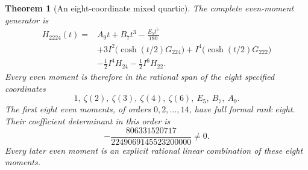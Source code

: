 \documentclass[11pt,letterpaper]{article}
\numberwithin{equation}{section}
\newtheorem{theorem}{Theorem}[section]
\theoremstyle{definition}
\theoremstyle{remark}
\begin{document}
\begin{theorem}[An eight-coordinate mixed quartic]
\label{mtp:quartic}
The complete even-moment generator is
\begin{equation}\label{mtp:H2224}
 \boxed{\begin{aligned}
 H_{2224}(t)={}&A_9t+B_7t^3-\frac{E_5t^5}{180}\\
 &+3I^2\bigl(\cosh(t/2)G_{224}\bigr)
       +I^4\bigl(\cosh(t/2)G_{222}\bigr)\\
 &-\frac12I^4H_{24}-\frac12I^6H_{22}.
 \end{aligned}}
\end{equation}
Every even moment is therefore in the rational span of the eight
specified coordinates
\begin{equation}\label{mtp:quartic-coordinates}
                1,\ \zeta(2),\ \zeta(3),\ \zeta(4),\ \zeta(6),\ E_5,\ B_7,\ A_9.
\end{equation}
The first eight even moments, of orders $0,2,\ldots,14$, have full
formal rank eight. Their coefficient determinant in this order is
\begin{equation}\label{mtp:quartic-determinant}
                      -\frac{806331520717}{2249069145523200000}\ne0.
\end{equation}
Every later even moment is an explicit rational linear combination
of these eight moments.
\end{theorem}
\end{document}
